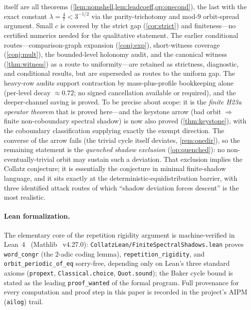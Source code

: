 \documentclass[11pt]{article}
\theoremstyle{plain}
\theoremstyle{definition}
\theoremstyle{remark}
\begin{document}
itself are all theorems
(\cref{lem:nomshell,lem:leadcoeff,op:onecond}), the last with the exact
constant $\lambda=\frac47<3^{-1/2}$ via the parity-trichotomy and
mod-$9$ orbit-spread argument. Small $c$ is covered by the
strict gap (\cref{cor:strict}) and finiteness---no certified numerics
needed for the qualitative statement.
The earlier conditional routes---comparison-graph expansion
(\cref{conj:exp}), short-witness coverage (\cref{conj:mult}), the
bounded-level holonomy audit, and the canonical witness
(\cref{thm:witness}) as a route to uniformity---are retained as
strictness, diagnostic, and conditional results, but are superseded as
routes to the uniform gap. The heavy-row audits support contraction by
mass-plus-profile bookkeeping alone (per-level decay $\approx0.72$; no
signed cancellation available or required), and the deeper-channel saving
is proved. To be precise about scope: it is the \emph{finite H23a operator
theorem} that is proved here---and the keystone arrow (bad orbit
$\Rightarrow$ finite non-coboundary spectral shadow) is now also proved
(\cref{thm:keystone}), with the coboundary classification supplying
exactly the exempt direction. The converse of the arrow fails (the
trivial cycle itself deviates, \cref{rem:onedir}), so the remaining
statement is the \emph{quenched shadow exclusion} (\cref{op:quenched}):
no non-eventually-trivial orbit may sustain such a deviation. That
exclusion implies the Collatz conjecture; it is essentially the
conjecture in minimal finite-shadow language, and it sits exactly at the
deterministic-equidistribution barrier, with three identified attack
routes of which ``shadow deviation forces descent'' is the most
realistic.

\paragraph{Lean formalization.} The elementary core of the repetition
rigidity argument is machine-verified in
Lean~4~\cite{demoura2021} (Mathlib~\cite{mathlib2020} v4.27.0):
\texttt{CollatzLean/FiniteSpectralShadows.lean} proves
\texttt{word\_congr} (the $2$-adic coding lemma),
\texttt{repetition\_rigidity}, and \texttt{orbit\_periodic\_of\_eq}
sorry-free, depending only on Lean's three standard axioms
(\texttt{propext}, \texttt{Classical.choice}, \texttt{Quot.sound});
the Baker cycle bound is stated as the leading \texttt{proof\_wanted}
of the formal program. Full provenance for every computation and proof
step in this paper is recorded in the project's AIPM (\texttt{ailog})
trail.
\end{document}
